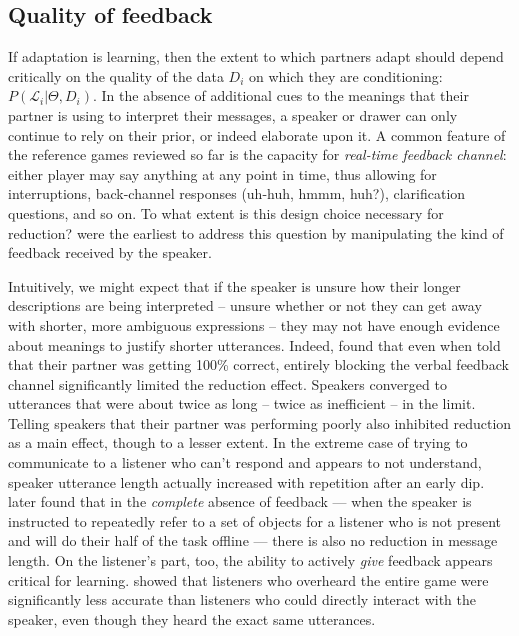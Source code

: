 \documentclass[11pt, floatsintext, jou]{apa6}
\begin{document}
\subsection{Quality of feedback}

If adaptation is learning, then the extent to which partners adapt should depend critically on the quality of the data $D_i$ on which they are conditioning: $P(\mathcal{L}_i | \Theta, D_i)$. In the absence of additional cues to the meanings that their partner is using to interpret their messages, a speaker or drawer can only continue to rely on their prior, or indeed elaborate upon it. A common feature of the reference games reviewed so far is the capacity for \emph{real-time feedback channel}: either player may say anything at any point in time, thus allowing for interruptions, back-channel responses (uh-huh, hmmm, huh?), clarification questions, and so on. To what extent is this design choice necessary for reduction?  were the earliest to address this question by manipulating the kind of feedback received by the speaker.


Intuitively, we might expect that if the speaker is unsure how their longer descriptions are being interpreted -- unsure whether or not they can get away with shorter, more ambiguous expressions -- they may not have enough evidence about meanings to justify shorter utterances. Indeed,  found that even when told that their partner was getting 100\% correct, entirely blocking the verbal feedback channel significantly limited the reduction effect. Speakers converged to utterances that were about twice as long -- twice as inefficient -- in the limit. Telling speakers that their partner was performing poorly also inhibited reduction as a main effect, though to a lesser extent. In the extreme case of trying to communicate to a listener who can't respond and appears to not understand, speaker utterance length actually increased with repetition after an early dip.  later found that in the \emph{complete} absence of feedback --- when the speaker is instructed to repeatedly refer to a set of objects for a listener who is not present and will do their half of the task offline --- there is also no reduction in message length. On the listener's part, too, the ability to actively \emph{give} feedback appears critical for learning.  showed that listeners who overheard the entire game were significantly less accurate than listeners who could directly interact with the speaker, even though they heard the exact same utterances.
\end{document}
